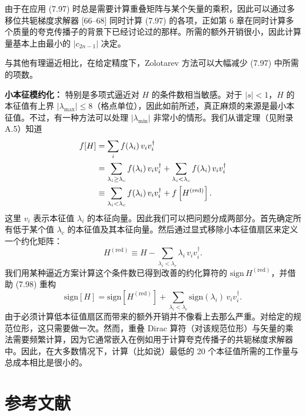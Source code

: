 由于在应用 (7.97) 时总是需要计算重叠矩阵与某个矢量的乘积，因此可以通过多移位共轭梯度求解器 [66--68] 同时计算 (7.97) 的各项，正如第 6 章在同时计算多个质量的夸克传播子的背景下已经讨论过的那样。所需的额外开销很小，因此计算量基本上由最小的 $|c_{2n-1}|$ 决定。

与其他有理逼近相比，在给定精度下，Zolotarev 方法可以大幅减少 (7.97) 中所需的项数。

\textbf{小本征模约化：} 特别是多项式逼近对 $H$ 的条件数相当敏感。对于 $|s| < 1$，$H$ 的本征值有上界 $|\lambda_{\max}| \leq 8$（格点单位），因此如前所述，真正麻烦的来源是最小本征值。不过，有一种方法可以处理 $|\lambda_{\min}|$ 非常小的情形。我们从谱定理（见附录 A.5）知道
\begin{align}
  f[H] &= \sum_i f(\lambda_i)\,v_i v_i^\dagger \notag\\
  &= \sum_{\lambda_i \geq \lambda_c} f(\lambda_i)\,v_i v_i^\dagger
    + \sum_{\lambda_i < \lambda_c} f(\lambda_i)\,v_i v_i^\dagger \notag\\
  &\equiv \sum_{\lambda_i < \lambda_c} f(\lambda_i)\,v_i v_i^\dagger
    + f\left[H^{\mathrm{(red)}}\right].
\end{align}
这里 $v_i$ 表示本征值 $\lambda_i$ 的本征向量。因此我们可以把问题分成两部分。首先确定所有低于某个值 $\lambda_c$ 的本征值及其本征向量。然后通过显式移除小本征值扇区来定义一个约化矩阵：
\begin{equation}
  H^{\mathrm{(red)}} \equiv H - \sum_{\lambda_i < \lambda_c}
  \lambda_i\,v_i v_i^\dagger .
\end{equation}
我们用某种逼近方案计算这个条件数已得到改善的约化算符的 $\mathrm{sign}\,H^{\mathrm{(red)}}$，并借助 (7.98) 重构
\begin{equation}
  \mathrm{sign}[H] = \mathrm{sign}\left[H^{\mathrm{(red)}}\right]
  + \sum_{\lambda_i < \lambda_c}\mathrm{sign}(\lambda_i)\,v_i v_i^\dagger .
\end{equation}
由于必须计算低本征值扇区而带来的额外开销并不像看上去那么严重。对给定的规范位形，这只需要做一次。然而，重叠 Dirac 算符（对该规范位形）与矢量的乘法需要频繁计算，因为它通常嵌入在例如用于计算夸克传播子的共轭梯度求解器中。因此，在大多数情况下，计算（比如说）最低的 20 个本征值所需的工作量与总成本相比是很小的。

\section*{参考文献}

